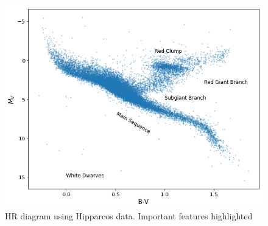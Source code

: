 \documentclass[12pt]{article}
\begin{document}
\begin{figure}
\centering
\includegraphics[width=5in]{hrdiagram.png}
\caption{HR diagram using Hipparcos data. Important features highlighted}
\end{figure}
\end{document}
